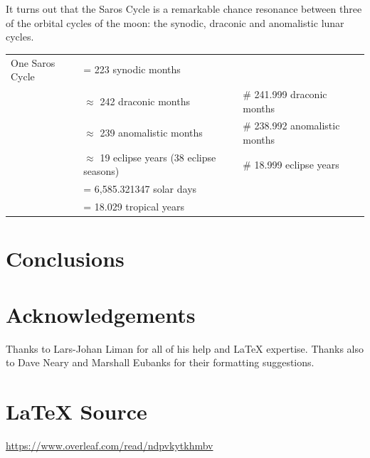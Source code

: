 \documentclass{article}
\theoremstyle{definition}
\begin{document}
\bigskip
\noindent
It turns out that the Saros Cycle is a remarkable chance
resonance between three of the orbital cycles of the moon: the
synodic, draconic and anomalistic lunar cycles.

\begin{flushleft}
\begin{tabular}{@{}l@{\ }l@{\qquad}l}
  One Saros Cycle
  & = 223 synodic months \\
  & $\approx$ 242 draconic months                       &\# 241.999 draconic months \\
  & $\approx$ 239 anomalistic months                    & \# 238.992 anomalistic months \\
  & $\approx$ 19 eclipse years (38 eclipse seasons)     & \# 18.999 eclipse years \\
  & = 6,585.321347 solar days \\
  & = 18.029  tropical years            
\end{tabular}
\end{flushleft}
%
%
%
\section{Conclusions}
%
%
%
\section*{Acknowledgements}
Thanks to Lars-Johan Liman for all of his help and \LaTeX
expertise. Thanks also to Dave Neary and Marshall Eubanks for
their formatting suggestions. 
%
%
\section*{\LaTeX \hspace{0.10 mm} Source}
\url{https://www.overleaf.com/read/ndpvkytkhmbv}
%
%
%


%
%
\end{document}
